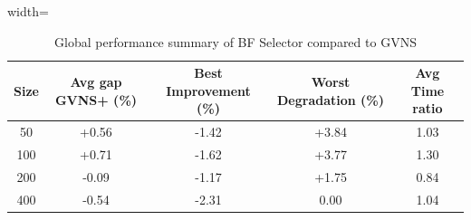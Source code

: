 \begin{table}[ht]
\centering
\footnotesize
\setlength{\tabcolsep}{4pt}
\caption{Global performance summary of BF Selector compared to GVNS}
\vspace{3mm}
\begin{adjustbox}{width=\textwidth}
\begin{tabular}{c c c c c}
\toprule
\textbf{Size} & \textbf{Avg gap GVNS+ (\%)} & \textbf{Best Improvement (\%)} & \textbf{Worst Degradation (\%)} & \textbf{Avg Time ratio} \\
\midrule
50  & +0.56 & -1.42 & +3.84  & 1.03 \\
100 & +0.71 & -1.62 & +3.77  & 1.30 \\
200 & -0.09 & -1.17 & +1.75  & 0.84 \\
400 & -0.54 & -2.31 &  0.00  & 1.04 \\
\bottomrule
\end{tabular}
\end{adjustbox}
\label{tab:bf_summary}
\end{table}